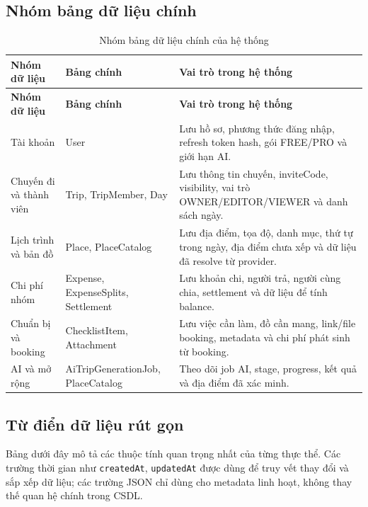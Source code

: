 \documentclass[a4paper]{report}
\begin{document}
\subsection{Nhóm bảng dữ liệu chính}

\begin{longtable}{|P{3.8cm}|P{5.6cm}|P{6.4cm}|}
\caption{Nhóm bảng dữ liệu chính của hệ thống}\\
\hline
\textbf{Nhóm dữ liệu} & \textbf{Bảng chính} & \textbf{Vai trò trong hệ thống}\\
\hline
\endfirsthead
\hline
\textbf{Nhóm dữ liệu} & \textbf{Bảng chính} & \textbf{Vai trò trong hệ thống}\\
\hline
\endhead
Tài khoản & User & Lưu hồ sơ, phương thức đăng nhập, refresh token hash, gói FREE/PRO và giới hạn AI.\\
\hline
Chuyến đi và thành viên & Trip, TripMember, Day & Lưu thông tin chuyến, inviteCode, visibility, vai trò OWNER/EDITOR/VIEWER và danh sách ngày.\\
\hline
Lịch trình và bản đồ & Place, PlaceCatalog & Lưu địa điểm, tọa độ, danh mục, thứ tự trong ngày, địa điểm chưa xếp và dữ liệu đã resolve từ provider.\\
\hline
Chi phí nhóm & Expense, ExpenseSplits, Settlement & Lưu khoản chi, người trả, người cùng chia, settlement và dữ liệu để tính balance.\\
\hline
Chuẩn bị và booking & ChecklistItem, Attachment & Lưu việc cần làm, đồ cần mang, link/file booking, metadata và chi phí phát sinh từ booking.\\
\hline
AI và mở rộng & AiTripGenerationJob, PlaceCatalog & Theo dõi job AI, stage, progress, kết quả và địa điểm đã xác minh.\\
\hline
\end{longtable}

\subsection{Từ điển dữ liệu rút gọn}

Bảng dưới đây mô tả các thuộc tính quan trọng nhất của từng thực thể. Các trường thời gian như \texttt{createdAt}, \texttt{updatedAt} được dùng để truy vết thay đổi và sắp xếp dữ liệu; các trường JSON chỉ dùng cho metadata linh hoạt, không thay thế quan hệ chính trong CSDL.
\end{document}
